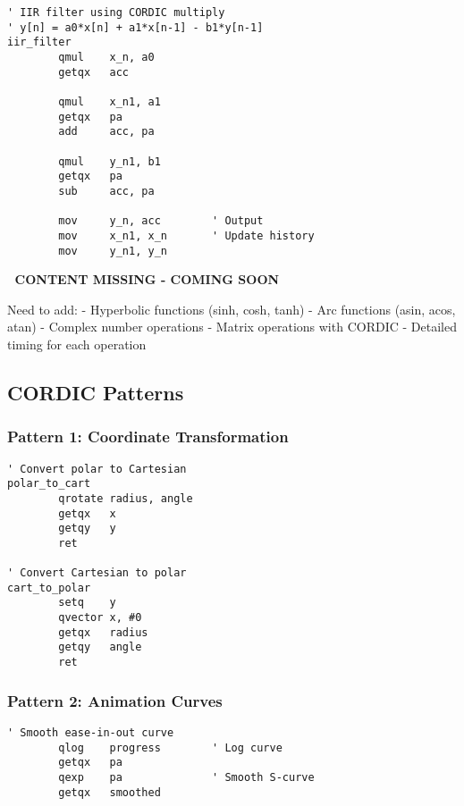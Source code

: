 \documentclass[11pt]{book}
\begin{document}
\begin{lstlisting}
' IIR filter using CORDIC multiply
' y[n] = a0*x[n] + a1*x[n-1] - b1*y[n-1]
iir_filter
        qmul    x_n, a0
        getqx   acc
        
        qmul    x_n1, a1
        getqx   pa
        add     acc, pa
        
        qmul    y_n1, b1
        getqx   pa
        sub     acc, pa
        
        mov     y_n, acc        ' Output
        mov     x_n1, x_n       ' Update history
        mov     y_n1, y_n
\end{lstlisting}

\begin{missing}
🚧 \textbf{CONTENT MISSING - COMING SOON}

Need to add:
- Hyperbolic functions (sinh, cosh, tanh)
- Arc functions (asin, acos, atan)
- Complex number operations
- Matrix operations with CORDIC
- Detailed timing for each operation
\end{missing}

\hypertarget{cordic-patterns}{%
\subsection{CORDIC Patterns}\label{cordic-patterns}}

\hypertarget{pattern-1-coordinate-transformation}{%
\subsubsection{Pattern 1: Coordinate
Transformation}\label{pattern-1-coordinate-transformation}}

\begin{lstlisting}
' Convert polar to Cartesian
polar_to_cart
        qrotate radius, angle
        getqx   x
        getqy   y
        ret
        
' Convert Cartesian to polar
cart_to_polar
        setq    y
        qvector x, #0
        getqx   radius
        getqy   angle
        ret
\end{lstlisting}

\hypertarget{pattern-2-animation-curves}{%
\subsubsection{Pattern 2: Animation
Curves}\label{pattern-2-animation-curves}}

\begin{lstlisting}
' Smooth ease-in-out curve
        qlog    progress        ' Log curve
        getqx   pa
        qexp    pa              ' Smooth S-curve
        getqx   smoothed
\end{lstlisting}
\end{document}
